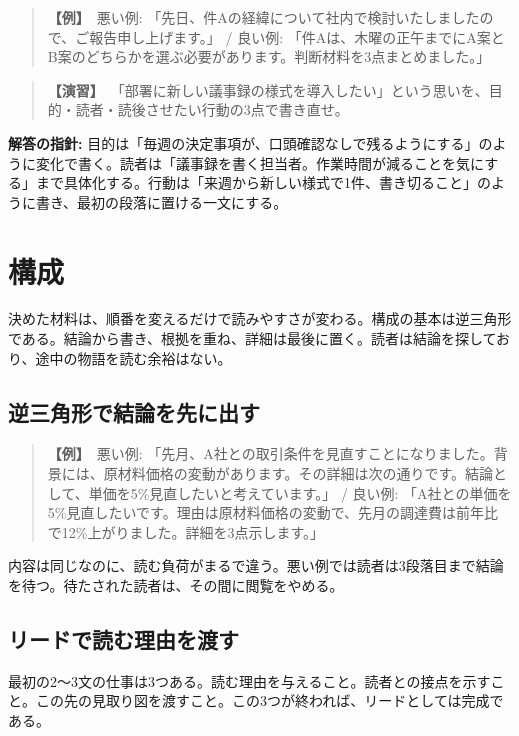 \documentclass{article}
\begin{document}
\begin{quote}
\textbf{【例】}\ 悪い例: 「先日、件Aの経緯について社内で検討いたしましたので、ご報告申し上げます。」 / 良い例: 「件Aは、木曜の正午までにA案とB案のどちらかを選ぶ必要があります。判断材料を3点まとめました。」
\end{quote}

\begin{quote}
\textbf{【演習】}\ 「部署に新しい議事録の様式を導入したい」という思いを、目的・読者・読後させたい行動の3点で書き直せ。
\end{quote}

\textbf{解答の指針:} 目的は「毎週の決定事項が、口頭確認なしで残るようにする」のように変化で書く。読者は「議事録を書く担当者。作業時間が減ることを気にする」まで具体化する。行動は「来週から新しい様式で1件、書き切ること」のように書き、最初の段落に置ける一文にする。

\section{構成}

決めた材料は、順番を変えるだけで読みやすさが変わる。構成の基本は逆三角形である。結論から書き、根拠を重ね、詳細は最後に置く。読者は結論を探しており、途中の物語を読む余裕はない。

\subsection{逆三角形で結論を先に出す}

\begin{quote}
\textbf{【例】}\ 悪い例: 「先月、A社との取引条件を見直すことになりました。背景には、原材料価格の変動があります。その詳細は次の通りです。結論として、単価を5\%見直したいと考えています。」 / 良い例: 「A社との単価を5\%見直したいです。理由は原材料価格の変動で、先月の調達費は前年比で12\%上がりました。詳細を3点示します。」
\end{quote}

内容は同じなのに、読む負荷がまるで違う。悪い例では読者は3段落目まで結論を待つ。待たされた読者は、その間に閲覧をやめる。

\subsection{リードで読む理由を渡す}

最初の2〜3文の仕事は3つある。読む理由を与えること。読者との接点を示すこと。この先の見取り図を渡すこと。この3つが終われば、リードとしては完成である。
\end{document}
